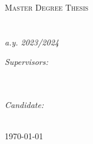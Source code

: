 
\begin{titlepage}
\begin{center}

{\scshape\LARGE \univname\par}\vspace{1.5cm} %
\textsc{\Large Master Degree Thesis}\\[0.5cm] %
\Large\deptname\\[0.5cm] %
\Large\facname\\[0.5cm] %
\textit{\normalsize a.y. 2023/2024} %

\vfill
\vfill

{\huge \bfseries \ttitle\par}\vspace{0.4cm} %
 


\vfill

\begin{minipage}[t]{0.4\textwidth}
\begin{flushleft} \large
\emph{Supervisors:} \\[0.2cm]
\supname\\[0.3cm] %
\cosupname\\[0.3cm] %
\cocosupname
\end{flushleft}
\end{minipage}
\begin{minipage}[t]{0.4\textwidth}
\begin{flushright} \large
\emph{Candidate:}\\[0.2cm]
\authorname %
\end{flushright}
\end{minipage}\\[1cm]

{\large \monthyeardate\today}\\[4cm] %
 
\end{center}
\end{titlepage}